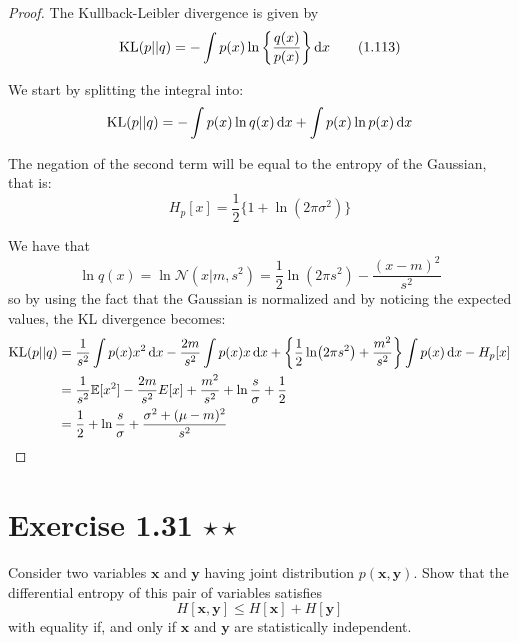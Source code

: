\begin{proof}
    The Kullback-Leibler divergence is given by 
    \begin{equation*}
        \text{KL}(p || q) = - \int p(x) \ln \bigg\{ \frac{q(x)}{p(x)} \bigg\} \mathop{}\!\mathrm{d} x
        \tag{1.113}\label{eq:1.113}
    \end{equation*}

    We start by splitting the integral into:
    \[
        \text{KL}(p || q) = 
            -\int p(x) \ln q(x) \mathop{}\!\mathrm{d} x + \int p(x) \ln p(x) \mathop{}\!\mathrm{d} x
    \] 

    The negation of the second term will be equal to the entropy of the Gaussian,
    that is:
    \begin{equation*}
        H_p[x] = \frac{1}{2} \{1 + \ln (2\pi \sigma^2)\}
        \tag{1.110}\label{eq:1.110}
    \end{equation*}

    We have that
    \[
        \ln q(x) = \ln \mathcal{N} (x | m, s^2) = \frac{1}{2} \ln(2\pi s^2) - \frac{(x - m)^2}{s^2}
    \] 
    so by using the fact that the Gaussian is normalized and by noticing the expected
    values, the KL divergence becomes:
    \begin{align*}
        \text{KL}(p || q) 
        &= \frac{1}{s^2}\int p(x) x^2 \mathop{}\!\mathrm{d} x - \frac{2m}{s^2} \int p(x) x \mathop{}\!\mathrm{d} x 
        + \bigg\{\frac{1}{2} \ln(2\pi s^2) + \frac{m^2}{s^2}\bigg\} \int p(x) \mathop{}\!\mathrm{d} x
        - H_p[x] \\
        &= \frac{1}{s^2} \mathbb{E}[x^2] - \frac{2m}{s^2}E[x] 
        + \frac{m^2}{s^2} + \ln \frac{s}{\sigma} + \frac{1}{2} \\
        &= \frac{1}{2} + \ln \frac{s}{\sigma} + \frac{\sigma^2 + (\mu - m)^2}{s^2}
    \end{align*}
\end{proof}

\section*{Exercise 1.31 $\star \star$}
Consider two variables $\mathbf{x}$ and $\mathbf{y}$ having joint distribution
$p(\mathbf{x}, \mathbf{y})$. Show that the differential entropy of this pair of 
variables satisfies
\begin{equation*}
    H[\mathbf{x}, \mathbf{y}] \leq H[\mathbf{x}] + H[\mathbf{y}]
    \tag{1.152}\label{eq:1.152}
\end{equation*}
with equality if, and only if $\mathbf{x}$ and $\mathbf{y}$ are statistically
independent.


